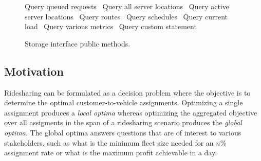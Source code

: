 \documentclass{article}
\def\nwendcode{\endtrivlist \endgroup}
\let\nwdocspar=\par
\theoremstyle{definition}
\begin{document}
\begin{figure}
{\begin{minipage}[t]{0.40\textwidth}
\LA{}Query queued requests~{\nwtagstyle{}}\RA{}
\LA{}Query all server locations~{\nwtagstyle{}}\RA{}
\LA{}Query active server locations~{\nwtagstyle{}}\RA{}
\LA{}Query routes~{\nwtagstyle{}}\RA{}
\LA{}Query schedules~{\nwtagstyle{}}\RA{}
\LA{}Query current load~{\nwtagstyle{}}\RA{}
\LA{}Query various metrics~{\nwtagstyle{}}\RA{}
\LA{}Query custom statement~{\nwtagstyle{}}\RA{}
\nwendcode{}\nwdocspar
\end{minipage}
}
\caption{Storage interface public methods.}
\label{fig:methods}
\end{figure}

\subsection{Motivation}
\label{sec:motivation}
Ridesharing can be formulated as a decision problem where the objective is to
determine the optimal customer-to-vehicle assignments. Optimizing a single
assignment produces a \emph{local optima} whereas optimizing the aggregated
objective over all assigments in the span of a ridesharing scenario produces
the \emph{global optima}. The global optima answers questions that are of
interest to various stakeholders, such as what is the minimum fleet size needed
for an $n$\% assignment rate or what is the maximum profit achievable in a day.
\end{document}
